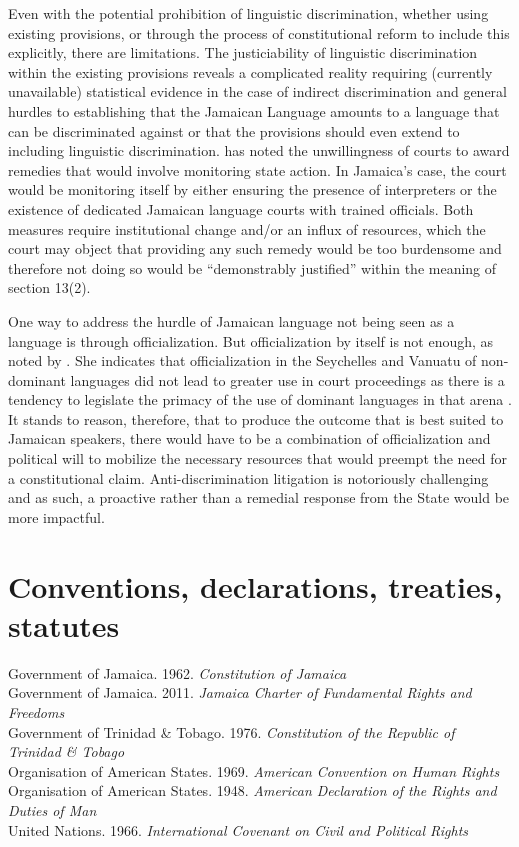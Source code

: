 \documentclass[output=paper,colorlinks,citecolor=brown]{langscibook}
\begin{document}
Even with the potential prohibition of linguistic discrimination, whether using existing provisions, or through the process of constitutional reform to include this explicitly, there are limitations. The justiciability of linguistic discrimination within the existing provisions reveals a complicated reality requiring (currently unavailable) statistical evidence in the case of indirect discrimination and general hurdles to establishing that the Jamaican Language amounts to a language that can be discriminated against or that the provisions should even extend to including linguistic discrimination. \citet[53-54]{BrownBlake2008} has noted the unwillingness of courts to award remedies that would involve monitoring state action. In Jamaica’s case, the court would be monitoring itself by either ensuring the presence of interpreters or the existence of dedicated Jamaican language courts with trained officials. Both measures require institutional change and/or an influx of resources, which the court may object that providing any such remedy would be too burdensome and therefore not doing so would be “demonstrably justified” within the meaning of section 13(2).

One way to address the hurdle of Jamaican language not being seen as a language is through officialization. But officialization by itself is not enough, as noted by \citet[65]{BrownBlake2014}. She indicates that officialization in the Seychelles and Vanuatu of non-dominant languages did not lead to greater use in court proceedings as there is a tendency to legislate the primacy of the use of dominant languages in that arena \citep[148]{BrownBlake2014}. It stands to reason, therefore, that to produce the outcome that is best suited to Jamaican speakers, there would have to be a combination of officialization and political will to mobilize the necessary resources that would preempt the need for a constitutional claim. Anti-discrimination litigation is notoriously challenging and as such, a proactive rather than a remedial response from the State would be more impactful.


{\sloppy\printbibliography[heading=subbibliography,notkeyword=this]}


\section*{Conventions, declarations, treaties, statutes}
  Government of Jamaica. 1962. \emph{Constitution of Jamaica} \\
  Government of Jamaica. 2011.  \emph{Jamaica Charter of Fundamental Rights and Freedoms} \\
  Government of Trinidad \& Tobago. 1976.  \emph{Constitution of the Republic of Trinidad \& Tobago}  \\
  Organisation of American States. 1969.  \emph{American Convention on Human Rights} \\
  Organisation of American States. 1948. \emph{American Declaration of the Rights and Duties of Man} \\
  United Nations. 1966.  \emph{International Covenant on Civil and Political Rights}
  
\end{document}
